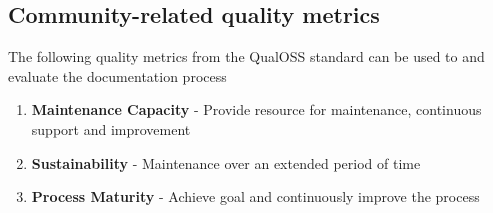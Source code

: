 \subsection{Community-related quality metrics} 
The following quality metrics from the QualOSS standard can be used to and evaluate the documentation process \cite{5314237}
\begin{enumerate}
\item \textbf{Maintenance Capacity} - Provide resource for maintenance, continuous support and improvement
\item \textbf{Sustainability} - Maintenance over an extended period of time
\item \textbf{Process Maturity} - Achieve goal and continuously improve the process
\end{enumerate}


